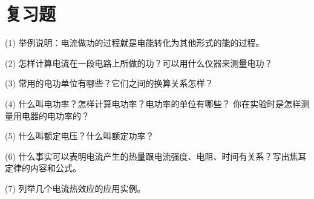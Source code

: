 \section*{复习题}

(1) 举例说明：电流做功的过程就是电能转化为其他形式的能的过程。

(2) 怎样计算电流在一段电路上所做的功？可以用什么仪器来测量电功？

(3) 常用的电功单位有哪些？它们之间的换算关系怎样？

(4) 什么叫电功率？怎样计算电功率？电功率的单位有哪些？
你在实验时是怎样测量用电器的电功率的？

(5) 什么叫额定电压？什么叫额定功率？

(6) 什么事实可以表明电流产生的热量跟电流强度、电阻、时间有关系？写出焦耳定律的内容和公式。

(7) 列举几个电流热效应的应用实例。

